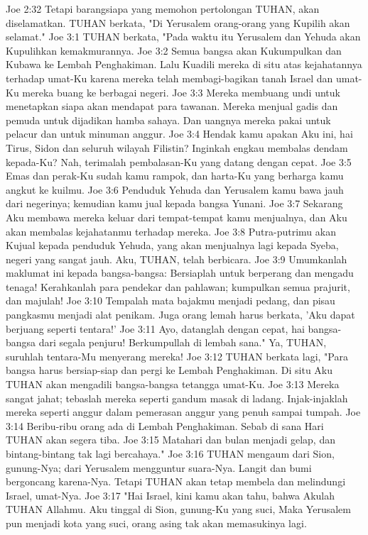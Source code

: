 Joe 2:32  Tetapi barangsiapa yang memohon pertolongan TUHAN, akan diselamatkan. TUHAN berkata, "Di Yerusalem orang-orang yang Kupilih akan selamat."
Joe 3:1  TUHAN berkata, "Pada waktu itu Yerusalem dan Yehuda akan Kupulihkan kemakmurannya.
Joe 3:2  Semua bangsa akan Kukumpulkan dan Kubawa ke Lembah Penghakiman. Lalu Kuadili mereka di situ atas kejahatannya terhadap umat-Ku karena mereka telah membagi-bagikan tanah Israel dan umat-Ku mereka buang ke berbagai negeri.
Joe 3:3  Mereka membuang undi untuk menetapkan siapa akan mendapat para tawanan. Mereka menjual gadis dan pemuda untuk dijadikan hamba sahaya. Dan uangnya mereka pakai untuk pelacur dan untuk minuman anggur.
Joe 3:4  Hendak kamu apakan Aku ini, hai Tirus, Sidon dan seluruh wilayah Filistin? Inginkah engkau membalas dendam kepada-Ku? Nah, terimalah pembalasan-Ku yang datang dengan cepat.
Joe 3:5  Emas dan perak-Ku sudah kamu rampok, dan harta-Ku yang berharga kamu angkut ke kuilmu.
Joe 3:6  Penduduk Yehuda dan Yerusalem kamu bawa jauh dari negerinya; kemudian kamu jual kepada bangsa Yunani.
Joe 3:7  Sekarang Aku membawa mereka keluar dari tempat-tempat kamu menjualnya, dan Aku akan membalas kejahatanmu terhadap mereka.
Joe 3:8  Putra-putrimu akan Kujual kepada penduduk Yehuda, yang akan menjualnya lagi kepada Syeba, negeri yang sangat jauh. Aku, TUHAN, telah berbicara.
Joe 3:9  Umumkanlah maklumat ini kepada bangsa-bangsa: Bersiaplah untuk berperang dan mengadu tenaga! Kerahkanlah para pendekar dan pahlawan; kumpulkan semua prajurit, dan majulah!
Joe 3:10  Tempalah mata bajakmu menjadi pedang, dan pisau pangkasmu menjadi alat penikam. Juga orang lemah harus berkata, 'Aku dapat berjuang seperti tentara!'
Joe 3:11  Ayo, datanglah dengan cepat, hai bangsa-bangsa dari segala penjuru! Berkumpullah di lembah sana." Ya, TUHAN, suruhlah tentara-Mu menyerang mereka!
Joe 3:12  TUHAN berkata lagi, "Para bangsa harus bersiap-siap dan pergi ke Lembah Penghakiman. Di situ Aku TUHAN akan mengadili bangsa-bangsa tetangga umat-Ku.
Joe 3:13  Mereka sangat jahat; tebaslah mereka seperti gandum masak di ladang. Injak-injaklah mereka seperti anggur dalam pemerasan anggur yang penuh sampai tumpah.
Joe 3:14  Beribu-ribu orang ada di Lembah Penghakiman. Sebab di sana Hari TUHAN akan segera tiba.
Joe 3:15  Matahari dan bulan menjadi gelap, dan bintang-bintang tak lagi bercahaya."
Joe 3:16  TUHAN mengaum dari Sion, gunung-Nya; dari Yerusalem mengguntur suara-Nya. Langit dan bumi bergoncang karena-Nya. Tetapi TUHAN akan tetap membela dan melindungi Israel, umat-Nya.
Joe 3:17  "Hai Israel, kini kamu akan tahu, bahwa Akulah TUHAN Allahmu. Aku tinggal di Sion, gunung-Ku yang suci, Maka Yerusalem pun menjadi kota yang suci, orang asing tak akan memasukinya lagi.
